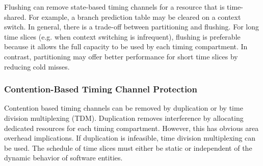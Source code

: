 Flushing can remove state-based timing channels for a resource that is time-shared.
For example, a branch prediction table may be cleared on a context switch.
In general, there is a trade-off between partitioning and flushing.
For long time slices (e.g. when context switching is infrequent), 
flushing is preferable because it allows the full capacity to be used by
each timing compartment. In contrast, partitioning may
offer better performance for short time slices by reducing cold misses.

\subsubsection{Contention-Based Timing Channel Protection}

Contention based timing channels can be removed by duplication or by
time division multiplexing (TDM). Duplication removes interference by
allocating dedicated resources for each timing compartment.
However, this has obvious area overhead implications. If 
duplication is infeasible, time division multiplexing can be used.
The schedule of time slices must either be static or independent of the 
dynamic behavior of software entities.

%


